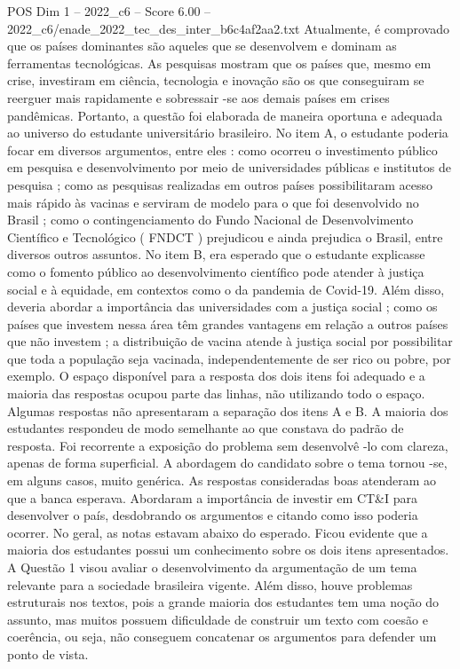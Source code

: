 \begin{textsample}{POS Dim 1 – 2022\_c6 – Score 6.00 – 2022\_c6/enade\_2022\_tec\_des\_inter\_b6c4af2aa2.txt}
Atualmente, é comprovado que os países dominantes são aqueles que se desenvolvem e dominam as ferramentas tecnológicas.
As pesquisas mostram que os países que, mesmo em crise, investiram em ciência, tecnologia e inovação são os que conseguiram se reerguer mais rapidamente e sobressair -se aos demais países em crises pandêmicas.
Portanto, a questão foi elaborada de maneira oportuna e adequada ao universo do estudante universitário brasileiro.
No item A, o estudante poderia focar em diversos argumentos, entre eles : como ocorreu o investimento público em pesquisa e desenvolvimento por meio de universidades públicas e institutos de pesquisa ; como as pesquisas realizadas em outros países possibilitaram acesso mais rápido às vacinas e serviram de modelo para o que foi desenvolvido no Brasil ; como o contingenciamento do Fundo Nacional de Desenvolvimento Científico e Tecnológico ( FNDCT ) prejudicou e ainda prejudica o Brasil, entre diversos outros assuntos.
No item B, era esperado que o estudante explicasse como o fomento público ao desenvolvimento científico pode atender à justiça social e à equidade, em contextos como o da pandemia de Covid-19.
Além disso, deveria abordar a importância das universidades com a justiça social ; como os países que investem nessa área têm grandes vantagens em relação a outros países que não investem ; a distribuição de vacina atende à justiça social por possibilitar que toda a população seja vacinada, independentemente de ser rico ou pobre, por exemplo.
O espaço disponível para a resposta dos dois itens foi adequado e a maioria das respostas ocupou parte das linhas, não utilizando todo o espaço.
Algumas respostas não apresentaram a separação dos itens A e B.
A maioria dos estudantes respondeu de modo semelhante ao que constava do padrão de resposta.
Foi recorrente a exposição do problema sem desenvolvê -lo com clareza, apenas de forma superficial.
A abordagem do candidato sobre o tema tornou -se, em alguns casos, muito genérica.
As respostas consideradas boas atenderam ao que a banca esperava.
Abordaram a importância de investir em CT\&I para desenvolver o país, desdobrando os argumentos e citando como isso poderia ocorrer.
No geral, as notas estavam abaixo do esperado.
Ficou evidente que a maioria dos estudantes possui um conhecimento sobre os dois itens apresentados.
A Questão 1 visou avaliar o desenvolvimento da argumentação de um tema relevante para a sociedade brasileira vigente.
Além disso, houve problemas estruturais nos textos, pois a grande maioria dos estudantes tem uma noção do assunto, mas muitos possuem dificuldade de construir um texto com coesão e coerência, ou seja, não conseguem concatenar os argumentos para defender um ponto de vista.

\end{textsample}
